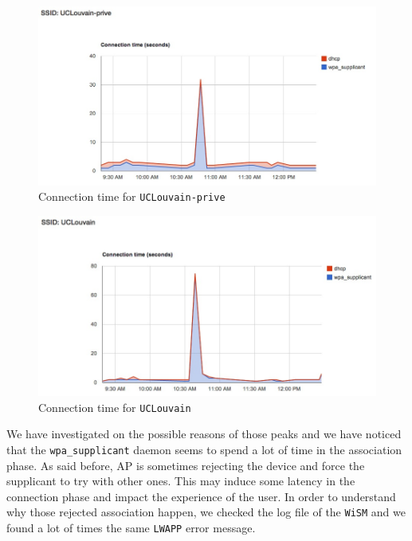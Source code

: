 \begin{figure}[H]
	\centering
   \includegraphics[width=1\textwidth]{Pictures/chapter6/time-uclouvain-prive.jpg}
   \caption{Connection time for \texttt{UCLouvain-prive}}
\end{figure} 

\begin{figure}[H]
	\centering
   \includegraphics[width=1\textwidth]{Pictures/chapter6/time-uclouvain.jpg}
   \caption{Connection time for \texttt{UCLouvain}}
\end{figure} 

 We have investigated on the possible reasons of those peaks and we have noticed that the \texttt{wpa\_supplicant} daemon seems to spend a lot of time in the association phase. As said before, AP is sometimes rejecting the device and force the supplicant to try with other ones. This may induce some latency in the connection phase and impact the experience of the user. In order to understand why those rejected association happen, we checked the log file of the \texttt{WiSM} and we found a lot of times the same \texttt{LWAPP} error message.\\
\begin{lstlisting}[frame=single,breaklines=true,caption={\texttt{WiSM} association error message}]
%LWAPP-3-INVALID_AID2: Association identifier [int] for client [hex]:[hex]:[hex]:[hex]:[hex]:[hex] is already in use by[hex]:[hex]:[hex]:[hex]:[hex]:[hex]
\end{lstlisting}

